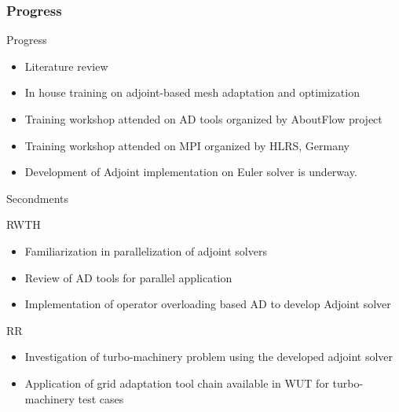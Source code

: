 
\begin{frame}
\frametitle{Progress}
\begin{block}{Progress}
\begin{itemize}
\item Literature review
\item In house training on adjoint-based mesh adaptation and optimization
\item Training workshop attended on AD tools organized by AboutFlow project
\item Training workshop attended on MPI organized by HLRS, Germany
\item Development of Adjoint implementation on Euler solver is underway.
\end{itemize}
\end{block}
\end{frame}

\begin{frame}{Secondments}

\begin{block}{RWTH}
\begin{itemize}
\item Familiarization in parallelization of adjoint solvers
\item Review of AD tools for parallel application
\item Implementation of operator overloading based AD to develop Adjoint solver 

\end{itemize}
\end{block}

\begin{block}{RR}
\begin{itemize}
\item Investigation of turbo-machinery problem using the developed adjoint solver 
\item Application of grid adaptation tool chain available in WUT for turbo-machinery test cases
\end{itemize}
\end{block}
\end{frame}

